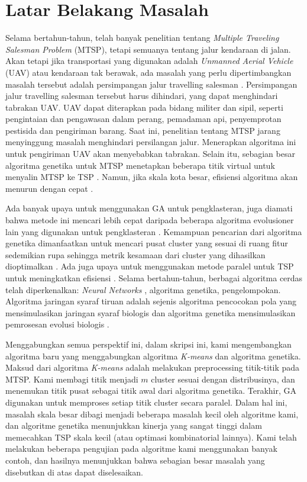 \section{Latar Belakang Masalah}

Selama bertahun-tahun, telah banyak penelitian tentang \textit{Multiple Traveling Salesman Problem} (MTSP), tetapi semuanya tentang jalur kendaraan di jalan. Akan tetapi jika transportasi yang digunakan adalah \textit{Unmanned Aerial Vehicle} (UAV) atau kendaraan tak berawak, ada masalah yang perlu dipertimbangkan masalah tersebut adalah persimpangan jalur travelling salesman \cite{inproceedings}. Persimpangan jalur travelling salesman tersebut harus dihindari, yang dapat menghindari tabrakan UAV. UAV dapat diterapkan pada bidang militer dan sipil, seperti pengintaian dan pengawasan dalam perang, pemadaman api, penyemprotan pestisida dan pengiriman barang.
Saat ini, penelitian tentang MTSP jarang menyinggung masalah menghindari persilangan jalur. Menerapkan algoritma ini untuk pengiriman UAV akan menyebabkan tabrakan. Selain itu, sebagian besar algoritma genetika untuk MTSP menetapkan beberapa titik virtual untuk menyalin MTSP ke TSP \cite{shengping2002hybrid}. Namun, jika skala kota besar, efisiensi algoritma akan menurun dengan cepat \cite{zhang2014parallel}.

Ada banyak upaya untuk menggunakan GA untuk pengklasteran, juga diamati bahwa metode ini mencari lebih cepat daripada beberapa algoritma evolusioner lain yang digunakan untuk pengklasteran \cite{krishna1999genetic}. Kemampuan pencarian dari algoritma genetika dimanfaatkan untuk mencari pusat cluster yang sesuai di ruang fitur sedemikian rupa sehingga metrik kesamaan dari cluster yang dihasilkan dioptimalkan \cite{maii2000genetic}. Ada juga upaya untuk menggunakan metode paralel untuk TSP untuk meningkatkan efisiensi \cite{li2016parallel}. Selama bertahun-tahun, berbagai algoritma cerdas telah diperkenalkan: \textit{Neural Networks} \cite{song2015asynchronous,zhang2015universality,pan2012spiking}, algoritma genetika, pengelompokan. Algoritma jaringan syaraf tiruan adalah sejenis algoritma pencocokan pola yang mensimulasikan jaringan syaraf biologis dan algoritma genetika mensimulasikan pemrosesan evolusi biologis \cite{liu2015implementation,zeng2014spiking,xu2016probe,zhang2014efficient}.

Menggabungkan semua perspektif ini, dalam skripsi ini, kami mengembangkan algoritma baru yang menggabungkan algoritma \textit{K-means} dan algoritma genetika. Maksud dari algoritma \textit{K-means} adalah melakukan preprocessing titik-titik pada MTSP. Kami membagi titik menjadi $m$ cluster sesuai dengan distribusinya, dan menemukan titik pusat sebagai titik awal dari algoritma genetika. Terakhir, GA digunakan untuk memproses setiap titik cluster secara paralel. Dalam hal ini, masalah skala besar dibagi menjadi beberapa masalah kecil oleh algoritme kami, dan algoritme genetika menunjukkan kinerja yang sangat tinggi dalam memecahkan TSP skala kecil (atau optimasi kombinatorial lainnya). Kami telah melakukan beberapa pengujian pada algoritme kami menggunakan banyak contoh, dan hasilnya menunjukkan bahwa sebagian besar masalah yang disebutkan di atas dapat diselesaikan.